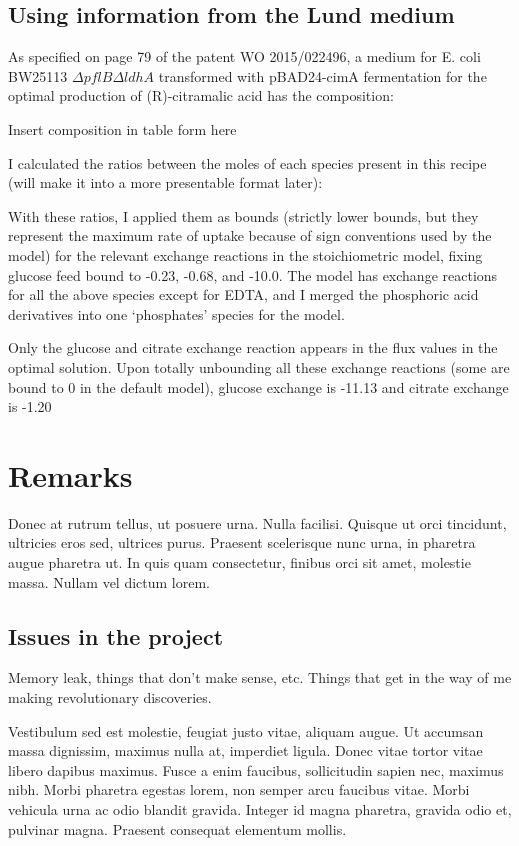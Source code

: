 \documentclass[parskip=full]{scrreprt}
\begin{document}
\section{Using information from the Lund medium}
\label{sec:lund}

As specified on page 79 of the patent WO 2015/022496, a medium for E. coli BW25113 $\Delta{}pflB\Delta{}ldhA$ transformed with pBAD24-cimA fermentation for the optimal production of (R)-citramalic acid has the composition:

Insert composition in table form here

I calculated the ratios between the moles of each species present in this recipe (will make it into a more presentable format later):

With these ratios, I applied them as bounds (strictly lower bounds, but they represent the maximum rate of uptake because of sign conventions used by the model) for the relevant exchange reactions in the stoichiometric model, fixing glucose feed bound to -0.23, -0.68, and -10.0. The model has exchange reactions for all the above species except for EDTA, and I merged the phosphoric acid derivatives into one ‘phosphates’ species for the model.

Only the glucose and citrate exchange reaction appears in the flux values in the optimal solution. Upon totally unbounding all these exchange reactions (some are bound to 0 in the default model), glucose exchange is -11.13 and citrate exchange is -1.20

\chapter{Remarks}
\label{ch:remarks}

Donec at rutrum tellus, ut posuere urna. Nulla facilisi. Quisque ut orci tincidunt, ultricies eros sed, ultrices purus. Praesent scelerisque nunc urna, in pharetra augue pharetra ut. In quis quam consectetur, finibus orci sit amet, molestie massa. Nullam vel dictum lorem. 

\section{Issues in the project}
\label{sec:issues}

Memory leak, things that don't make sense, etc. Things that get in the way of me making revolutionary discoveries.

Vestibulum sed est molestie, feugiat justo vitae, aliquam augue. Ut accumsan massa dignissim, maximus nulla at, imperdiet ligula. Donec vitae tortor vitae libero dapibus maximus. Fusce a enim faucibus, sollicitudin sapien nec, maximus nibh. Morbi pharetra egestas lorem, non semper arcu faucibus vitae. Morbi vehicula urna ac odio blandit gravida. Integer id magna pharetra, gravida odio et, pulvinar magna. Praesent consequat elementum mollis.
\end{document}
